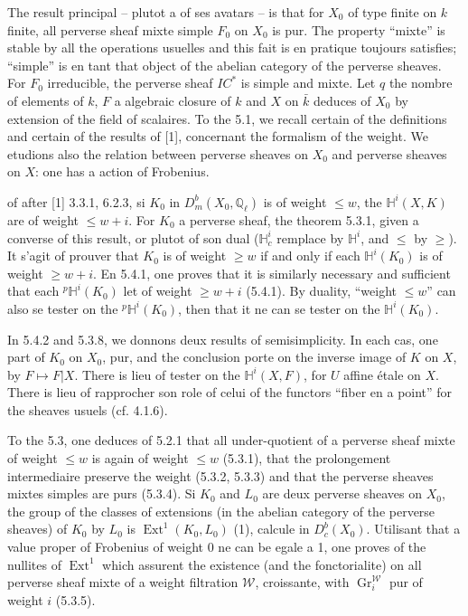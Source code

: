 \documentclass[12pt,a4paper]{article}
\theoremstyle{plain}
\theoremstyle{definition}
\theoremstyle{remark}
\DeclareMathOperator{\Ext}{Ext}
\DeclareMathOperator{\Gr}{Gr}
\newcommand{\HH}{\mathbb{H}}
\newcommand{\IC}{\mathit{IC}}
\newcommand{\QQ}{\mathbb{Q}}
\begin{document}
The result principal -- plutot a of ses avatars -- is that for $X_{0}$ of type finite on $k$ finite, all perverse sheaf mixte simple $F_{0}$ on $X_{0}$ is pur. The property ``mixte'' is stable by all the operations usuelles and this fait is en pratique toujours satisfies; ``simple'' is en tant that object of the abelian category of the perverse sheaves. For $F_{0}$ irreducible, the perverse sheaf $\IC^{*}$ is simple and mixte. Let $q$ the nombre of elements of $k$, $F$ a algebraic closure of $k$ and $X$ on $\bar{k}$ deduces of $X_{0}$ by extension of the field of scalaires. To the 5.1, we recall certain of the definitions and certain of the results of [1], concernant the formalism of the weight. We etudions also the relation between perverse sheaves on $X_{0}$ and perverse sheaves on $X$: one has a action of Frobenius.

of after [1] 3.3.1, 6.2.3, si $K_{0}$ in $D^{b}_{m}(X_{0}, \QQ_{\ell})$ is of weight $\leq w$, the $\HH^{i}(X, K)$ are of weight $\leq w{+}i$. For $K_{0}$ a perverse sheaf, the theorem 5.3.1, given a converse of this result, or plutot of son dual ($\HH^{i}_{c}$ remplace by $\HH^{i}$, and $\leq$ by $\geq$). It s'agit of prouver that $K_{0}$ is of weight $\geq w$ if and only if each $\HH^{i}(K_{0})$ is of weight $\geq w{+}i$. En 5.4.1, one proves that it is similarly necessary and sufficient that each ${}^{p}\HH^{i}(K_{0})$ let of weight $\geq w{+}i$ (5.4.1). By duality, ``weight $\leq w$'' can also se tester on the ${}^{p}\HH^{i}(K_{0})$, then that it ne can se tester on the $\HH^{i}(K_{0})$.

In 5.4.2 and 5.3.8, we donnons deux results of semisimplicity. In each cas, one part of $K_{0}$ on $X_{0}$, pur, and the conclusion porte on the inverse image of $K$ on $X$, by $F \mapsto F|X$. There is lieu of tester on the $\HH^{i}(X, F)$, for $U$ affine étale on $X$. There is lieu of rapprocher son role of celui of the functors ``fiber en a point'' for the sheaves usuels (cf. 4.1.6).

To the 5.3, one deduces of 5.2.1 that all under-quotient of a perverse sheaf mixte of weight $\leq w$ is again of weight $\leq w$ (5.3.1), that the prolongement intermediaire preserve the weight (5.3.2, 5.3.3) and that the perverse sheaves mixtes simples are purs (5.3.4). Si $K_{0}$ and $L_{0}$ are deux perverse sheaves on $X_{0}$, the group of the classes of extensions (in the abelian category of the perverse sheaves) of $K_{0}$ by $L_{0}$ is $\Ext^{1}(K_{0}, L_{0})$ (1), calcule in $D^{b}_{c}(X_{0})$. Utilisant that a value proper of Frobenius of weight $0$ ne can be egale a 1, one proves of the nullites of $\Ext^{1}$ which assurent the existence (and the fonctorialite) on all perverse sheaf mixte of a weight filtration $\mathcal{W}$, croissante, with $\Gr^{\mathcal{W}}_{i}$ pur of weight $i$ (5.3.5).
\end{document}

